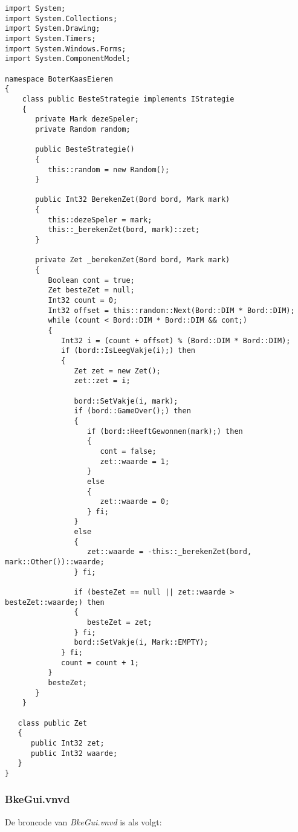 \begin{lstlisting}
import System;
import System.Collections;
import System.Drawing;
import System.Timers;
import System.Windows.Forms;
import System.ComponentModel;

namespace BoterKaasEieren
{
	class public BesteStrategie implements IStrategie
	{
	   private Mark dezeSpeler;
	   private Random random;
	   
	   public BesteStrategie()
	   {
	      this::random = new Random();
	   }
	   
	   public Int32 BerekenZet(Bord bord, Mark mark)
	   {
	      this::dezeSpeler = mark;
	      this::_berekenZet(bord, mark)::zet;
	   }
	   
	   private Zet _berekenZet(Bord bord, Mark mark)
	   {
	      Boolean cont = true;
	      Zet besteZet = null;
	      Int32 count = 0;
	      Int32 offset = this::random::Next(Bord::DIM * Bord::DIM);
	      while (count < Bord::DIM * Bord::DIM && cont;)
	      {
	         Int32 i = (count + offset) % (Bord::DIM * Bord::DIM);
	         if (bord::IsLeegVakje(i);) then
	         {
	            Zet zet = new Zet();
	            zet::zet = i;
	            
	            bord::SetVakje(i, mark);
	            if (bord::GameOver();) then
	            {
	               if (bord::HeeftGewonnen(mark);) then
	               {
	                  cont = false;
	                  zet::waarde = 1;
	               }
	               else
	               {
	                  zet::waarde = 0;
	               } fi;
	            }
	            else
	            {
	               zet::waarde = -this::_berekenZet(bord, mark::Other())::waarde;
	            } fi;
	            
	            if (besteZet == null || zet::waarde > besteZet::waarde;) then
	            {
	               besteZet = zet;
	            } fi;
	            bord::SetVakje(i, Mark::EMPTY);
	         } fi;
	         count = count + 1;
	      }
	      besteZet;
	   }
	}

   class public Zet
   {      
      public Int32 zet;
      public Int32 waarde;
   }
}
\end{lstlisting}

\subsubsection{BkeGui.vnvd}
De broncode van \textit{BkeGui.vnvd} is als volgt:


